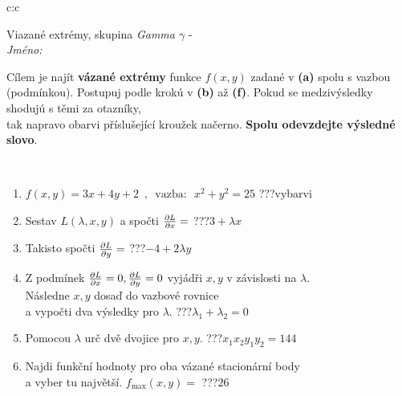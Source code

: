 \documentclass[10pt]{report}
\begin{document}
\begin{tabular}{c:c}
\begin{minipage}[c][104.5mm][t]{0.5\linewidth}
\begin{center}
\vspace{7mm}
{\huge Viazané extrémy, skupina \textit{Gamma $\gamma$} -}\\[5mm]
\textit{Jméno:}\phantom{xxxxxxxxxxxxxxxxxxxxxxxxxxxxxxxxxxxxxxxxxxxxxxxxxxxxxxxxxxxxxxxxx}\\[5mm]
\begin{minipage}{0.95\linewidth}
\begin{center}
Cílem je najít \textbf{vázané extrémy} funkce $f(x,y)$ zadané v \textbf{(a)} spolu s vazbou (podmínkou). Postupuj podle krokú v \textbf{(b)} až \textbf{(f)}. Pokud se medzivýsledky shodujú s těmi za otazníky,\\tak napravo obarvi příslušející kroužek načerno. \textbf{Spolu odevzdejte výsledné slovo}.
\end{center}
\end{minipage}
\\[1mm]
\begin{minipage}{0.79\linewidth}
\begin{center}
\begin{varwidth}{\linewidth}
\begin{enumerate}
\normalsize
\item $f(x,y)=3x+4y+2 \enspace , \enspace \mathrm{vazba:} \enspace x^2+y^2=25$\quad \dotfill\; ???\;\dotfill \quad vybarvi
\item Sestav $L(\lambda,x,y)$ a spočti $\pdv{L}{x}=$\quad \dotfill\; ???\;\dotfill \quad $3+\lambda x$
\item Takisto spočti $\pdv{L}{y}=$\quad \dotfill\; ???\;\dotfill \quad $-4+2\lambda y$
\item Z podmínek $\pdv{L}{x}=0 , \pdv{L}{y}=0$ vyjádři $x,y$ v závislosti na $\lambda$.\\ \phantom{xxxxxx}Následne $x,y$ dosaď do vazbové rovnice\\ \phantom{xxxxxx}a vypočti dva výsledky pro $\lambda$.\quad \dotfill\; ???\;\dotfill \quad $\lambda_1+\lambda_2=0$
\item Pomocou $\lambda$ urč dvě dvojice pro $x,y$.\quad \dotfill\; ???\;\dotfill \quad $x_1 x_2 y_1 y_2=144$
\item Najdi funkční hodnoty pro oba vázané stacionární body\\ \phantom{xxxxxx}a vyber tu najvětší. $f_{\text{max}}(x,y)=$\quad \dotfill\; ???\;\dotfill \quad $26$

\end{enumerate}
\end{varwidth}
\end{center}
\end{minipage}
\end{center}
\end{minipage}
\end{tabular}
\end{document}
